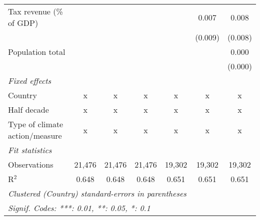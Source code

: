 \begin{tabular}{lcccccc}
   Tax revenue (\% of GDP)                                        &         &                &                &               & 0.007         & 0.008\\   
                                                                  &         &                &                &               & (0.009)       & (0.008)\\   
   Population total                                               &         &                &                &               &               & 0.000\\   
                                                                  &         &                &                &               &               & (0.000)\\   
   \emph{Fixed effects}\\
   Country                                                        & x       & x              & x              & x             & x             & x\\  
   Half decade                                                    & x       & x              & x              & x             & x             & x\\  
   Type of climate action/measure                                 & x       & x              & x              & x             & x             & x\\  
   \midrule \emph{Fit statistics}\\
   Observations                                                   & 21,476  & 21,476         & 21,476         & 19,302        & 19,302        & 19,302\\  
   R$^2$                                                          & 0.648   & 0.648          & 0.648          & 0.651         & 0.651         & 0.651\\  
   \midrule
   \multicolumn{7}{l}{\emph{Clustered (Country) standard-errors in parentheses}}\\
   \multicolumn{7}{l}{\emph{Signif. Codes: ***: 0.01, **: 0.05, *: 0.1}}\\
\end{tabular}
\par\endgroup


